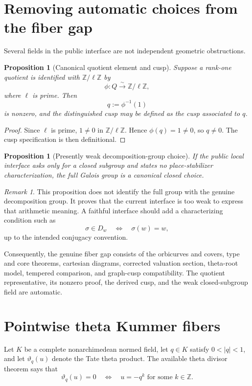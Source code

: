 \documentclass[11pt]{amsart}
\newtheorem{proposition}[theorem]{Proposition}
\theoremstyle{definition}
\theoremstyle{remark}
\newtheorem{remark}[theorem]{Remark}
\newcommand{\Z}{\mathbb Z}
\newcommand{\thetaK}{\vartheta}
\begin{document}
\section{Removing automatic choices from the fiber gap}

Several fields in the public interface are not independent geometric
obstructions.

\begin{proposition}[Canonical quotient element and cusp]
Suppose a rank-one quotient is identified with $\Z/\ell\Z$ by
\[
 \phi:Q\overset\sim\longrightarrow \Z/\ell\Z,
\]
where $\ell$ is prime.  Then
\[
 q:=\phi^{-1}(1)
\]
is nonzero, and the distinguished cusp may be defined as the cusp associated
to $q$.
\end{proposition}

\begin{proof}
Since $\ell$ is prime, $1\ne0$ in $\Z/\ell\Z$.  Hence
$\phi(q)=1\ne0$, so $q\ne0$.  The cusp specification is then definitional.
\end{proof}

\begin{proposition}[Presently weak decomposition-group choice]
If the public local interface asks only for a closed subgroup and states no
place-stabilizer characterization, the full Galois group is a canonical closed
choice.
\end{proposition}

\begin{remark}
This proposition does not identify the full group with the genuine
decomposition group.  It proves that the current interface is too weak to
express that arithmetic meaning.  A faithful interface should add a
characterizing condition such as
\[
 \sigma\in D_w\quad\Longleftrightarrow\quad \sigma(w)=w,
\]
up to the intended conjugacy convention.
\end{remark}

Consequently, the genuine fiber gap consists of the orbicurves and covers,
type and core theorems, cartesian diagrams, corrected valuation section,
theta-root model, tempered comparison, and graph-cusp compatibility.  The
quotient representative, its nonzero proof, the derived cusp, and the weak
closed-subgroup field are automatic.

\section{Pointwise theta Kummer fibers}

Let $K$ be a complete nonarchimedean normed field, let $q\in K$ satisfy
$0<|q|<1$, and let $\thetaK_q(u)$ denote the Tate theta product.  The available
theta divisor theorem says that
\[
 \thetaK_q(u)=0
 \quad\Longleftrightarrow\quad
 u=-q^k\text{ for some }k\in\Z.
\]
\end{document}
